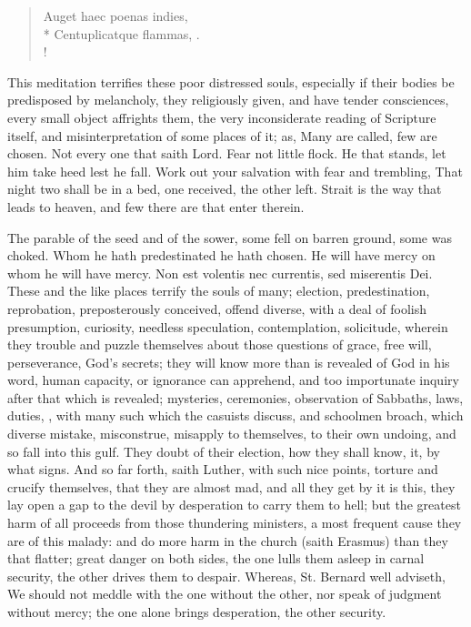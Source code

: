 {\begin{latin}
\begin{verse}
Auget haec poenas indies,\\*
Centuplicatque flammas, \etc{}.\\!
\end{verse}
\end{latin}

This meditation terrifies these poor distressed souls, especially if
their bodies be predisposed by melancholy, they religiously given, and
have tender consciences, every small object affrights them, the very
inconsiderate reading of Scripture itself, and misinterpretation of
some places of it; as, Many are called, few are chosen. Not every one
that saith Lord. Fear not little flock. He that stands, let him take
heed lest he fall. Work out your salvation with fear and trembling,
That night two shall be in a bed, one received, the other left. Strait
is the way that leads to heaven, and few there are that enter therein.

The parable of the seed and of the sower, some fell on barren ground,
some was choked. Whom he hath predestinated he hath chosen. He will
have mercy on whom he will have mercy. Non est volentis nec currentis,
sed miserentis Dei. These and the like places terrify the souls of
many; election, predestination, reprobation, preposterously conceived,
offend diverse, with a deal of foolish presumption, curiosity, needless
speculation, contemplation, solicitude, wherein they trouble and puzzle
themselves about those questions of grace, free will, perseverance,
God's secrets; they will know more than is revealed of God in his word,
human capacity, or ignorance can apprehend, and too importunate inquiry
after that which is revealed; mysteries, ceremonies, observation of
Sabbaths, laws, duties, \etc{}, with many such which the casuists discuss,
and schoolmen broach, which diverse mistake, misconstrue, misapply to
themselves, to their own undoing, and so fall into this gulf. They
doubt of their election, how they shall know, it, by what signs. And so
far forth, saith Luther, with such nice points, torture and crucify
themselves, that they are almost mad, and all they get by it is this,
they lay open a gap to the devil by desperation to carry them to hell;
but the greatest harm of all proceeds from those thundering ministers,
a most frequent cause they are of this malady: and do more harm
in the church (saith Erasmus) than they that flatter; great danger on
both sides, the one lulls them asleep in carnal security, the other
drives them to despair. Whereas, St. Bernard well adviseth, We
should not meddle with the one without the other, nor speak of judgment
without mercy; the one alone brings desperation, the other security.

}

